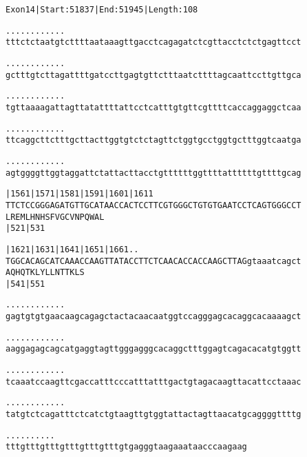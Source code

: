 \documentclass{article}
\begin{document}
\newpage
\begin{alltt}
Exon 14 | Start: 51837 | End: 51945 | Length: 108

.    .    .    .    .    .    .    .    .    .    .    .    
tttctctaatgtcttttaataaagttgacctcagagatctcgttacctctctgagttcct

.    .    .    .    .    .    .    .    .    .    .    .    
gctttgtcttagattttgatccttgagtgttctttaatcttttagcaattccttgttgca

.    .    .    .    .    .    .    .    .    .    .    .    
tgttaaaagattagttatattttattcctcatttgtgttcgttttcaccaggaggctcaa

.    .    .    .    .    .    .    .    .    .    .    .    
ttcaggcttctttgcttacttggtgtctctagttctggtgcctggtgctttggtcaatga

.    .    .    .    .    .    .    .    .    .    .    .    
agtggggttggtaggattctattacttacctgttttttggttttattttttgttttgcag

  |1561     |1571     |1581     |1591     |1601     |1611   
TTCTCCGGGAGATGTTGCATAACCACTCCTTCGTGGGCTGTGTGAATCCTCAGTGGGCCT
  L  R  E  M  L  H  N  H  S  F  V  G  C  V  N  P  Q  W  A  L
  |521                          |531                        

  |1621     |1631     |1641     |1651     |1661      .    . 
TGGCACAGCATCAAACCAAGTTATACCTTCTCAACACCACCAAGCTTAGgtaaatcagct
  A  Q  H  Q  T  K  L  Y  L  L  N  T  T  K  L  S            
  |541                          |551                        

   .    .    .    .    .    .    .    .    .    .    .    . 
gagtgtgtgaacaagcagagctactacaacaatggtccagggagcacaggcacaaaagct

   .    .    .    .    .    .    .    .    .    .    .    . 
aaggagagcagcatgaggtagttgggagggcacaggctttggagtcagacacatgtggtt

   .    .    .    .    .    .    .    .    .    .    .    . 
tcaaatccaagttcgaccatttcccatttatttgactgtagacaagttacattcctaaac

   .    .    .    .    .    .    .    .    .    .    .    . 
tatgtctcagatttctcatctgtaagttgtggtattactagttaacatgcaggggttttg

   .    .    .    .    .    .    .    .    .    .
tttgtttgtttgtttgtttgtttgtgagggtaagaaataacccaagaag
\end{alltt}
\newpage
\end{document}
